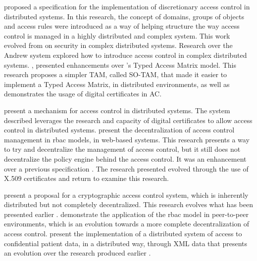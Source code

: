 \citeauthor{moffett_specifying_1990} \cite{moffett_specifying_1990} proposed a specification for the implementation of discretionary access control in distributed systems. In this research, the concept of domains, groups of objects and access rules were introduced as a way of helping structure the way access control is managed in a highly distributed and complex system. This work evolved from \citeauthor{satyanarayanan_integrating_1989} \cite{satyanarayanan_integrating_1989} on security in complex distributed systems. Research over the Andrew system \cite{satyanarayanan_integrating_1989} explored how to introduce access control in complex distributed systems. \citeauthor{sandhu_implementation_1992} \cite{sandhu_implementation_1992}, presented enhancements over  \citeauthor{sandhu_typed_1992}’s \cite{sandhu_typed_1992} Typed Access Matrix model. This research proposes a simpler TAM, called SO-TAM, that made it easier to implement a Typed Access Matrix, in distributed environments, as well as demonstrates the usage of digital certificates in AC.

\citeauthor{johnston_authorization_1998} \cite{johnston_authorization_1998} present a mechanism for access control in distributed systems. The system described leverages the research and capacity of digital certificates to allow access control in distributed systems. \citeauthor{sandhu_decentralized_1998} \cite{sandhu_decentralized_1998} present the decentralization of access control management in \gls{rbac} models, in web-based systems. This research presents a way to try and decentralize the management of access control, but it still does not decentralize the policy engine behind the access control. It was an enhancement over a previous specification \cite{barkley_role_1997}. The research presented \cite{sandhu_decentralized_1998} evolved through the use of X.509 certificates \cite{park_smart_1999} and \citeauthor{park_role-based_2001} \cite{park_role-based_2001} return to examine this research.

\citeauthor{harrington_cryptographic_2003} \cite{harrington_cryptographic_2003} present a proposal for a cryptographic access control system, which is inherently distributed but not completely decentralized. This research evolves what has been presented earlier \cite{satyanarayanan_integrating_1989}. \citeauthor{park_role-based_2003} \cite{park_role-based_2003} demonstrate the application of the \gls{rbac} model in peer-to-peer environments, which is an evolution towards a more complete decentralization of access control. \citeauthor{abiteboul_electronic_2004} \cite{abiteboul_electronic_2004} present the implementation of a distributed system of access to confidential patient data, in a distributed way, through XML data that presents an evolution over the research produced earlier \cite{damiani_fine-grained_2002}.

